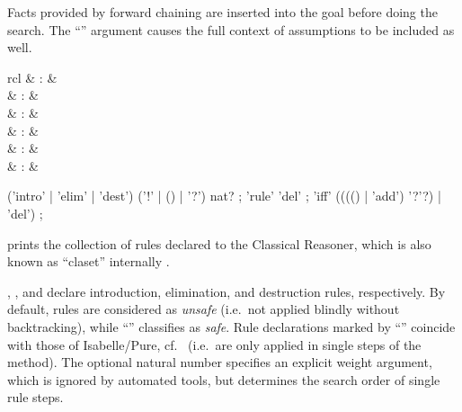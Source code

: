 \begin{isabellebody}
\begin{isamarkuptext}
\begin{descr}
  Facts provided by forward chaining are inserted into the goal before
  doing the search.  The ``\isa{{\isacharbang}}'' argument causes the full
  context of assumptions to be included as well.

  \end{descr}%
\end{isamarkuptext}%
\isamarkuptrue%
%
\isamarkuptrue%
%
\begin{isamarkuptext}%
\begin{matharray}{rcl}
    \mbox{}\isa{\isactrlsup {\isacharasterisk}} & : &  \\
    \mbox{} & : & \isaratt \\
    \mbox{} & : & \isaratt \\
    \mbox{} & : & \isaratt \\
    \mbox{} & : & \isaratt \\
    \mbox{} & : & \isaratt \\
  \end{matharray}

  \begin{rail}
    ('intro' | 'elim' | 'dest') ('!' | () | '?') nat?
    ;
    'rule' 'del'
    ;
    'iff' (((() | 'add') '?'?) | 'del')
    ;
  \end{rail}

  \begin{descr}

  \item [\mbox{\isa{\isacommand{print{\isacharunderscore}claset}}}] prints the collection of rules
  declared to the Classical Reasoner, which is also known as
  ``claset'' internally \cite{isabelle-ref}.
  
  \item [\mbox{\isa{intro}}, \mbox{\isa{elim}}, and \mbox{\isa{dest}}]
  declare introduction, elimination, and destruction rules,
  respectively.  By default, rules are considered as \emph{unsafe}
  (i.e.\ not applied blindly without backtracking), while ``\isa{{\isacharbang}}'' classifies as \emph{safe}.  Rule declarations marked by
  ``\isa{{\isacharquery}}'' coincide with those of Isabelle/Pure, cf.\
   (i.e.\ are only applied in single steps
  of the \mbox{\isa{rule}} method).  The optional natural number
  specifies an explicit weight argument, which is ignored by automated
  tools, but determines the search order of single rule steps.


\end{descr}
\end{isamarkuptext}
\end{isabellebody}
